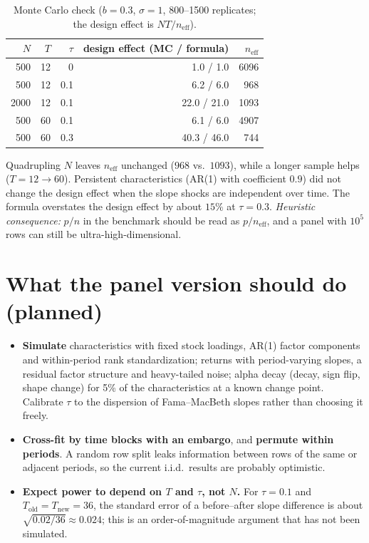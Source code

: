 \documentclass[11pt]{article}
\begin{document}
\begin{table}[h]
\centering
\caption{Monte Carlo check ($b=0.3$, $\sigma=1$, 800--1500 replicates; the design effect is $NT/n_{\text{eff}}$).}
\begin{tabular}{rrrrr}
\toprule
$N$ & $T$ & $\tau$ & design effect (MC / formula) & $n_{\text{eff}}$ \\
\midrule
500  & 12 & 0   & 1.0 / 1.0  & 6096 \\
500  & 12 & 0.1 & 6.2 / 6.0  & 968 \\
2000 & 12 & 0.1 & 22.0 / 21.0 & 1093 \\
500  & 60 & 0.1 & 6.1 / 6.0  & 4907 \\
500  & 60 & 0.3 & 40.3 / 46.0 & 744 \\
\bottomrule
\end{tabular}
\end{table}

Quadrupling $N$ leaves $n_{\text{eff}}$ unchanged ($968$ vs.\ $1093$), while a longer sample helps ($T=12\to60$). Persistent characteristics (AR(1) with coefficient $0.9$) did not change the design effect when the slope shocks are independent over time. The formula overstates the design effect by about $15\%$ at $\tau=0.3$.
\emph{Heuristic consequence:} $p/n$ in the benchmark should be read as $p/n_{\text{eff}}$, and a panel with $10^5$ rows can still be ultra-high-dimensional.

\section{What the panel version should do (planned)}
\begin{itemize}
\item \textbf{Simulate} characteristics with fixed stock loadings, AR(1) factor components and within-period rank standardization; returns with period-varying slopes, a residual factor structure and heavy-tailed noise; alpha decay (decay, sign flip, shape change) for 5\% of the characteristics at a known change point. Calibrate $\tau$ to the dispersion of Fama--MacBeth slopes rather than choosing it freely.
\item \textbf{Cross-fit by time blocks with an embargo}, and \textbf{permute within periods}. A random row split leaks information between rows of the same or adjacent periods, so the current i.i.d.\ results are probably optimistic.
\item \textbf{Expect power to depend on $T$ and $\tau$, not $N$.} For $\tau=0.1$ and $T_{\text{old}}=T_{\text{new}}=36$, the standard error of a before--after slope difference is about $\sqrt{0.02/36}\approx0.024$; this is an order-of-magnitude argument that has not been simulated.
\end{itemize}
\end{document}
